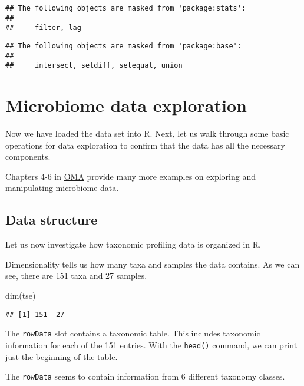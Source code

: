 \documentclass[
  oneside]{book}
\newenvironment{Shaded}{\begin{snugshade}}{\end{snugshade}}
\newcommand{\FunctionTok}[1]{\textcolor[rgb]{0.00,0.00,0.00}{#1}}
\newcommand{\NormalTok}[1]{#1}
\begin{document}
\begin{verbatim}
## The following objects are masked from 'package:stats':
## 
##     filter, lag
\end{verbatim}

\begin{verbatim}
## The following objects are masked from 'package:base':
## 
##     intersect, setdiff, setequal, union
\end{verbatim}

\hypertarget{microbiome-data-exploration}{%
\chapter{Microbiome data exploration}\label{microbiome-data-exploration}}

Now we have loaded the data set into R. Next, let us walk through some
basic operations for data exploration to confirm that the data has all
the necessary components.

Chapters 4-6 in
\href{https://microbiome.github.io/OMA/datamanipulation.html}{OMA} provide
many more examples on exploring and manipulating microbiome data.

\hypertarget{data-structure}{%
\section{Data structure}\label{data-structure}}

Let us now investigate how taxonomic profiling data is organized in R.

Dimensionality tells us how many taxa and samples the data
contains. As we can see, there are 151 taxa and 27
samples.

\begin{Shaded}
\begin{Highlighting}[]
\FunctionTok{dim}\NormalTok{(tse)}
\end{Highlighting}
\end{Shaded}

\begin{verbatim}
## [1] 151  27
\end{verbatim}

The \texttt{rowData} slot contains a taxonomic table. This includes taxonomic
information for each of the 151 entries. With the \texttt{head()}
command, we can print just the beginning of the table.

The \texttt{rowData} seems to contain information from 6
different taxonomy classes.
\end{document}
